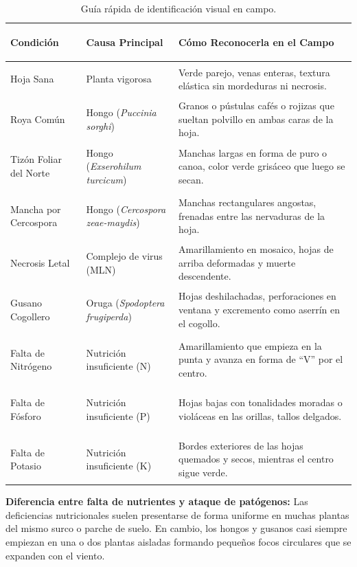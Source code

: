 \documentclass[11pt,a4paper]{report}
\begin{document}
\vspace{2mm}
\begin{table}[H]
\centering
\small
\begin{tabularx}{\linewidth}{>{\bfseries\raggedright\arraybackslash}p{3.6cm} >{\raggedright\arraybackslash}p{4.2cm} >{\raggedright\arraybackslash}X}
\toprule
\textbf{Condición} & \textbf{Causa Principal} & \textbf{Cómo Reconocerla en el Campo} \\
\midrule
Hoja Sana & Planta vigorosa & Verde parejo, venas enteras, textura elástica sin mordeduras ni necrosis. \\
\addlinespace
Roya Común & Hongo (\textit{Puccinia sorghi}) & Granos o pústulas cafés o rojizas que sueltan polvillo en ambas caras de la hoja. \\
\addlinespace
Tizón Foliar del Norte & Hongo (\textit{Exserohilum turcicum}) & Manchas largas en forma de puro o canoa, color verde grisáceo que luego se secan. \\
\addlinespace
Mancha por Cercospora & Hongo (\textit{Cercospora zeae-maydis}) & Manchas rectangulares angostas, frenadas entre las nervaduras de la hoja. \\
\addlinespace
Necrosis Letal & Complejo de virus (MLN) & Amarillamiento en mosaico, hojas de arriba deformadas y muerte descendente. \\
\addlinespace
Gusano Cogollero & Oruga (\textit{Spodoptera frugiperda}) & Hojas deshilachadas, perforaciones en ventana y excremento como aserrín en el cogollo. \\
\addlinespace
Falta de Nitrógeno & Nutrición insuficiente (N) & Amarillamiento que empieza en la punta y avanza en forma de ``V'' por el centro. \\
\addlinespace
Falta de Fósforo & Nutrición insuficiente (P) & Hojas bajas con tonalidades moradas o violáceas en las orillas, tallos delgados. \\
\addlinespace
Falta de Potasio & Nutrición insuficiente (K) & Bordes exteriores de las hojas quemados y secos, mientras el centro sigue verde. \\
\bottomrule
\end{tabularx}
\caption{Guía rápida de identificación visual en campo.}
\label{tab:catalogo_resumen}
\end{table}

\vspace{3mm}
\begin{agronote}
    \textbf{Diferencia entre falta de nutrientes y ataque de patógenos:} Las deficiencias nutricionales suelen presentarse de forma uniforme en muchas plantas del mismo surco o parche de suelo. En cambio, los hongos y gusanos casi siempre empiezan en una o dos plantas aisladas formando pequeños focos circulares que se expanden con el viento.
\end{agronote}
\end{document}
